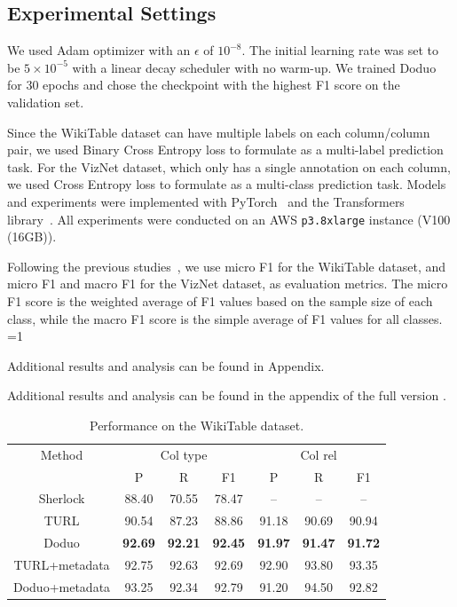 \documentclass[sigconf]{acmart}
\newcommand{\arxiv}{1} %
\newcommand{\name}{\mbox{\sc Doduo}}
\newcommand{\rev}[1]{#1}
\newcommand{\revcr}[1]{#1}
\begin{document}
\subsection{Experimental Settings}
We used Adam optimizer with an $\epsilon$ of $10^{-8}$. The initial learning rate was set to be $5\times 10^{-5}$ with a linear decay scheduler with no warm-up.
%
We trained \name{} for 30 epochs \rev{and chose the checkpoint with the highest F1 score on the validation set.}


Since the WikiTable dataset can have multiple labels on each column/column pair, we used Binary Cross Entropy loss to formulate as a multi-label prediction task.
%
For the VizNet dataset, which only has a single annotation on each column, we used Cross Entropy loss to formulate as a multi-class prediction task.
%
Models and experiments were implemented with PyTorch~\cite{PyTorch:NeurIPS2019} and the Transformers library~\cite{Wolf-etal:2020:Transformers}. All experiments were conducted on an AWS {\tt p3.8xlarge} instance (V100 (16GB)).

Following the previous studies~\cite{Deng:2020:TURL,Zhang:2020:Sato}, we use micro F1 for the WikiTable dataset, and micro F1 and macro F1 for the VizNet dataset, as evaluation metrics. 
%
\rev{The micro F1 score is the weighted average of F1 values based on the sample size of each class, while the macro F1 score is the simple average of F1 values for all classes.}
%
\ifnum \arxiv=1
\revcr{
Additional results and analysis can be found in Appendix.
}
\else
\revcr{
Additional results and analysis can be found in the appendix of the full version \cite{suhara2021annotating}.
}
\fi
%



\begin{table}[t]
\centering
\footnotesize
\caption{Performance on the WikiTable dataset.
}\label{tab:main_turl}
\vspace{-1em}
\begin{tabular}{c|ccc|ccc}\hline
Method & \multicolumn{3}{c|}{Col type} & \multicolumn{3}{c}{Col rel} \\
       & P & R & F1 & P & R & F1 \\\hline\hline
Sherlock
& \rev{88.40} & \rev{70.55} & 78.47 & -- & -- & --\\
TURL     & \rev{90.54} & \rev{87.23} & 88.86 & \rev{91.18} & \rev{90.69} & 90.94 \\
\name   & \rev{{\bf 92.69}} & \rev{{\bf 92.21}} & {\bf 92.45} & \rev{{\bf 91.97}} & \rev{{\bf 91.47}} & {\bf 91.72} \\\hline
\rev{TURL+metadata} & \rev{92.75} & \rev{92.63} & \rev{92.69} & \rev{92.90} & \rev{93.80} & \rev{93.35} \\
\rev{\name+metadata} & 93.25 & 92.34 & 92.79 & 91.20 & 94.50 & 92.82 \\\hline
\end{tabular}
\end{table}
\end{document}
